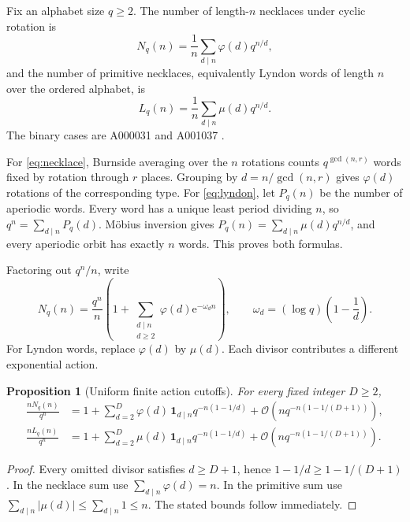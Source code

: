 \documentclass[11pt,a4paper]{article}
\numberwithin{equation}{section}
\newtheorem{proposition}[theorem]{Proposition}
\theoremstyle{definition}
\theoremstyle{remark}
\newcommand{\ee}{\mathrm e}
\newcommand{\bigO}{\mathcal O}
\begin{document}
Fix an alphabet size $q\ge2$. The number of length-$n$ necklaces under cyclic rotation is
\begin{equation}
 N_q(n)=\frac1n\sum_{d\mid n}\varphi(d)q^{n/d},
 \label{eq:necklace}
\end{equation}
and the number of primitive necklaces, equivalently Lyndon words of length $n$ over the ordered alphabet, is
\begin{equation}
 L_q(n)=\frac1n\sum_{d\mid n}\mu(d)q^{n/d}.
 \label{eq:lyndon}
\end{equation}
The binary cases are A000031 and A001037 \cite{oeisnecklace,oeislyndon}.

For \eqref{eq:necklace}, Burnside averaging over the $n$ rotations counts $q^{\gcd(n,r)}$ words fixed by rotation through $r$ places. Grouping by $d=n/\gcd(n,r)$ gives $\varphi(d)$ rotations of the corresponding type. For \eqref{eq:lyndon}, let $P_q(n)$ be the number of aperiodic words. Every word has a unique least period dividing $n$, so $q^n=\sum_{d\mid n}P_q(d)$. M\"obius inversion gives $P_q(n)=\sum_{d\mid n}\mu(d)q^{n/d}$, and every aperiodic orbit has exactly $n$ words. This proves both formulas.

Factoring out $q^n/n$, write
\begin{equation}
 N_q(n)=\frac{q^n}{n}\left(1+
 \sum_{\substack{d\mid n\\d\ge2}}\varphi(d)\ee^{-\omega_dn}\right),
 \qquad \omega_d=(\log q)\left(1-\frac1d\right).
 \label{eq:necklace-sectors}
\end{equation}
For Lyndon words, replace $\varphi(d)$ by $\mu(d)$. Each divisor contributes a different exponential action.

\begin{proposition}[Uniform finite action cutoffs]
\label{prop:necklace-cutoff}
For every fixed integer $D\ge2$,
\begin{align}
 \frac{nN_q(n)}{q^n}
 &=1+\sum_{d=2}^{D}\varphi(d)\,\mathbf1_{d\mid n}
             q^{-n(1-1/d)}
    +\bigO\!\left(nq^{-n(1-1/(D+1))}\right),\nonumber\\
 \frac{nL_q(n)}{q^n}
 &=1+\sum_{d=2}^{D}\mu(d)\,\mathbf1_{d\mid n}
             q^{-n(1-1/d)}
    +\bigO\!\left(nq^{-n(1-1/(D+1))}\right).
 \label{eq:necklace-cutoff}
\end{align}
\end{proposition}
\begin{proof}
Every omitted divisor satisfies $d\ge D+1$, hence
$1-1/d\ge1-1/(D+1)$. In the necklace sum use
$\sum_{d\mid n}\varphi(d)=n$. In the primitive sum use
$\sum_{d\mid n}|\mu(d)|\le\sum_{d\mid n}1\le n$.
The stated bounds follow immediately.
\end{proof}
\end{document}
